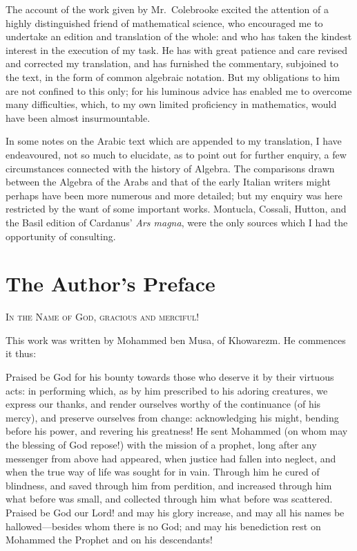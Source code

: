The account of the work given by Mr.~Colebrooke excited the attention of a highly distinguished friend of mathematical science, who encouraged me to undertake an edition and translation of the whole: and who has taken the kindest interest in the execution of my task. He has with great patience and care revised and corrected my translation, and has furnished the commentary, subjoined to the text, in the form of common algebraic notation. But my obligations to him are not confined to this only; for his luminous advice has enabled me to overcome many difficulties, which, to my own limited proficiency in mathematics, would have been almost insurmountable.

In some notes on the Arabic text which are appended to my translation, I have endeavoured, not so much to elucidate, as to point out for further enquiry, a few circumstances connected with the history of Algebra. The comparisons drawn between the Algebra of the Arabs and that of the early Italian writers might perhaps have been more numerous and more detailed; but my enquiry was here restricted by the want of some important works. Montucla, Cossali, Hutton, and the Basil edition of Cardanus' \textit{Ars magna}, were the only sources which I had the opportunity of consulting.

\clearpage

\section*{The Author's Preface}

\begin{center}
\textsc{In the Name of God, gracious and merciful!}
\end{center}

\vspace{0.3cm}
\noindent This work was written by Mohammed ben Musa, of Khowarezm. He commences it thus:

Praised be God for his bounty towards those who deserve it by their virtuous acts: in performing which, as by him prescribed to his adoring creatures, we express our thanks, and render ourselves worthy of the continuance (of his mercy), and preserve ourselves from change: acknowledging his might, bending before his power, and revering his greatness! He sent Mohammed (on whom may the blessing of God repose!) with the mission of a prophet, long after any messenger from above had appeared, when justice had fallen into neglect, and when the true way of life was sought for in vain. Through him he cured of blindness, and saved through him from perdition, and increased through him what before was small, and collected through him what before was scattered. Praised be God our Lord! and may his glory increase, and may all his names be hallowed---besides whom there is no God; and may his benediction rest on Mohammed the Prophet and on his descendants!

